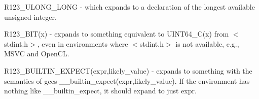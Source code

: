 \begin{DoxyItemize}
\item R123\+\_\+\+U\+L\+O\+N\+G\+\_\+\+L\+O\+NG -\/ which expands to a declaration of the longest available unsigned integer.


\item R123\+\_\+B\+I\+T(x) -\/ expands to something equivalent to U\+I\+N\+T64\+\_\+\+C(x) from $<$stdint.\+h$>$, even in environments where $<$stdint.\+h$>$ is not available, e.\+g., M\+S\+VC and Open\+CL.


\item R123\+\_\+\+B\+U\+I\+L\+T\+I\+N\+\_\+\+E\+X\+P\+E\+C\+T(expr,likely\+\_\+value) -\/ expands to something with the semantics of gcc\textquotesingle{}s \+\_\+\+\_\+builtin\+\_\+expect(expr,likely\+\_\+value). If the environment has nothing like \+\_\+\+\_\+builtin\+\_\+expect, it should expand to just expr. 
\end{DoxyItemize}